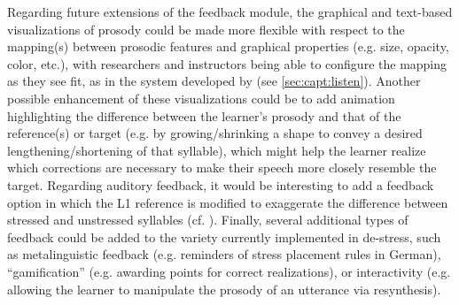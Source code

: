 	Regarding future extensions of the feedback module, the graphical and text-based visualizations of prosody could be made more flexible with respect to the mapping(s) between prosodic features and graphical properties (e.g. size, opacity, color, etc.), with researchers and instructors being able to configure the mapping as they see fit, as in the system developed by \textcite{Sitaram2011} (see \cref{sec:capt:listen}). Another possible enhancement of these visualizations could be to add animation highlighting the difference between the learner's prosody and that of the reference(s) or target (e.g. by growing/shrinking a shape to convey a desired lengthening/shortening of that syllable), which might help the learner realize which corrections are necessary to make their speech more closely resemble the target. 
	Regarding auditory feedback, it would be interesting to add a feedback option in which the L1 reference is modified to exaggerate the difference between stressed and unstressed syllables (cf. \cite{Bissiri2006,Bissiri2009}).
	Finally, several additional types of feedback could be added to the variety currently implemented in de-stress, such as  metalinguistic feedback (e.g. reminders of stress placement rules in German), ``gamification'' (e.g. awarding points for correct realizations), or interactivity (e.g. allowing the learner to manipulate the prosody of an utterance via resynthesis). 


	
	
	
	
